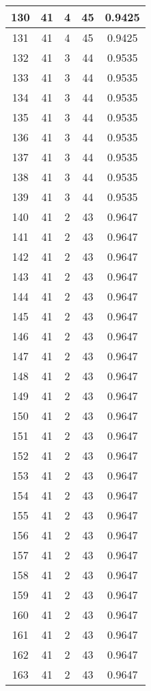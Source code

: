 \documentclass[letterpaper, 12pt]{article}
\begin{document}
\begin{longtable}{|c|c|c|c|c|}
\hline
130 & 41 & 4 & 45 & 0.9425 \\
\hline
131 & 41 & 4 & 45 & 0.9425 \\
\hline
132 & 41 & 3 & 44 & 0.9535 \\
\hline
133 & 41 & 3 & 44 & 0.9535 \\
\hline
134 & 41 & 3 & 44 & 0.9535 \\
\hline
135 & 41 & 3 & 44 & 0.9535 \\
\hline
136 & 41 & 3 & 44 & 0.9535 \\
\hline
137 & 41 & 3 & 44 & 0.9535 \\
\hline
138 & 41 & 3 & 44 & 0.9535 \\
\hline
139 & 41 & 3 & 44 & 0.9535 \\
\hline
140 & 41 & 2 & 43 & 0.9647 \\
\hline
141 & 41 & 2 & 43 & 0.9647 \\
\hline
142 & 41 & 2 & 43 & 0.9647 \\
\hline
143 & 41 & 2 & 43 & 0.9647 \\
\hline
144 & 41 & 2 & 43 & 0.9647 \\
\hline
145 & 41 & 2 & 43 & 0.9647 \\
\hline
146 & 41 & 2 & 43 & 0.9647 \\
\hline
147 & 41 & 2 & 43 & 0.9647 \\
\hline
148 & 41 & 2 & 43 & 0.9647 \\
\hline
149 & 41 & 2 & 43 & 0.9647 \\
\hline
150 & 41 & 2 & 43 & 0.9647 \\
\hline
151 & 41 & 2 & 43 & 0.9647 \\
\hline
152 & 41 & 2 & 43 & 0.9647 \\
\hline
153 & 41 & 2 & 43 & 0.9647 \\
\hline
154 & 41 & 2 & 43 & 0.9647 \\
\hline
155 & 41 & 2 & 43 & 0.9647 \\
\hline
156 & 41 & 2 & 43 & 0.9647 \\
\hline
157 & 41 & 2 & 43 & 0.9647 \\
\hline
158 & 41 & 2 & 43 & 0.9647 \\
\hline
159 & 41 & 2 & 43 & 0.9647 \\
\hline
160 & 41 & 2 & 43 & 0.9647 \\
\hline
161 & 41 & 2 & 43 & 0.9647 \\
\hline
162 & 41 & 2 & 43 & 0.9647 \\
\hline
163 & 41 & 2 & 43 & 0.9647 \\

\end{longtable}
\end{document}
